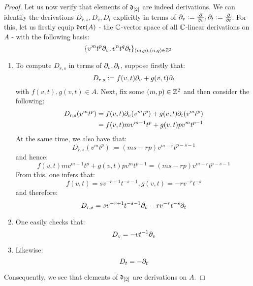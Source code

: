 \begin{proof}
                Let us now verify that elements of $\mathfrak{d}_{[2]}$ are indeed derivations. We can identify the derivations $D_{r, s}, D_v, D_t$ explicitly in terms of $\partial_v := \frac{\partial}{\partial v}, \partial_t := \frac{\partial}{\partial t}$. For this, let us firstly equip $\mathfrak{der}(A)$ - the $\mathbb{C}$-vector space of all $\mathbb{C}$-linear derivations on $A$ - with the following basis:
                    $$\{ v^m t^p \partial_v, v^n t^q \partial_t \}_{(m, p), (n, q) \in \mathbb{Z}^2}$$
                \begin{enumerate}
                    \item To compute $D_{r, s}$ in terms of $\partial_v, \partial_t$, suppose firstly that:
                        $$D_{r, s} := f(v, t) \partial_v + g(v, t) \partial_t$$
                    with $f(v, t), g(v, t) \in A$. Next, fix some $(m, p) \in \mathbb{Z}^2$ and then consider the following:
                        $$
                            \begin{aligned}
                                D_{r, s}( v^m t^p ) & = f(v, t) \partial_v( v^m t^p ) + g(v, t) \partial_t( v^m t^p )
                                \\
                                & = f(v, t) m v^{m - 1} t^p + g(v, t) p v^m t^{p - 1}
                            \end{aligned}
                        $$
                    At the same time, we also have that:
                        $$D_{r, s}(v^m t^p) := ( ms - rp ) v^{m - r} t^{p - s - 1}$$
                    and hence:
                        $$f(v, t) m v^{m - 1} t^p + g(v, t) p v^m t^{p - 1} = ( ms - rp ) v^{m - r} t^{p - s - 1}$$
                    From this, one infers that:
                        $$f(v, t) = s v^{-r + 1} t^{-s - 1}, g(v, t) = -r v^{-r} t^{-s}$$
                    and therefore:
                        $$D_{r, s} = s v^{-r + 1} t^{-s - 1} \partial_v - r v^{-r} t^{-s} \partial_t$$
                    \item One easily checks that:
                        $$D_v = -v t^{-1} \partial_v$$
                    \item Likewise:
                        $$D_t = -\partial_t$$
                \end{enumerate}
                Consequently, we see that elements of $\mathfrak{d}_{[2]}$ are derivations on $A$.
            \end{proof}

